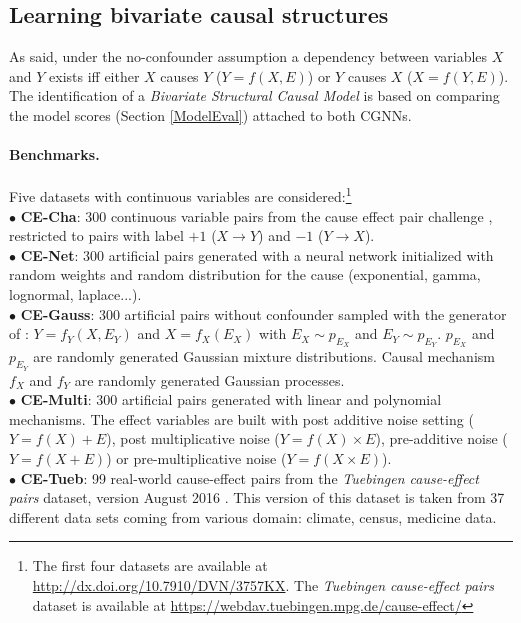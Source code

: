 \documentclass[a4paper, 11pt]{article}
\begin{document}
\subsection{Learning bivariate causal structures \label{bivariate_structure}}\label{sec:bivariate}

As said, under the no-confounder assumption a dependency between variables $X$ and $Y$ exists iff either $X$ causes $Y$ ($Y = f(X,E)$) or $Y$ causes $X$ ($X = f(Y,E)$). The identification of a \textit{Bivariate Structural Causal Model}  is based on comparing the model scores (Section \ref{ModelEval}) attached to both CGNNs.


\paragraph{Benchmarks.} Five datasets with continuous variables are considered:\footnote{The first four datasets are available at \url{http://dx.doi.org/10.7910/DVN/3757KX}. The \textit{Tuebingen cause-effect pairs} dataset is available at \url{https://webdav.tuebingen.mpg.de/cause-effect/}}\\
$\bullet$ \textbf{CE-Cha}: 300 continuous variable pairs from the cause effect pair challenge \citep{guyon2013cepc}, restricted to pairs with label  $+1$ ($X \rightarrow Y$) and $-1$ ($Y \rightarrow X$). \\
$\bullet$ \textbf{CE-Net}: 300 artificial pairs generated with a neural network initialized with random weights and random distribution for the cause (exponential, gamma, lognormal, laplace...).\\
$\bullet$ \textbf{CE-Gauss}: 300 artificial pairs without confounder sampled with the generator of  \cite{mooij2016distinguishing}:
$Y = f_Y(X,E_Y)$ and $X = f_X(E_X)$ with  $E_X \sim p_{E_X}$ and  $E_Y \sim p_{E_Y}$. $p_{E_X}$ and $p_{E_Y}$ are randomly generated Gaussian mixture distributions. Causal mechanism $f_X$ and $f_Y$ are randomly generated Gaussian processes. \\
$\bullet$ \textbf{CE-Multi}: 300 artificial pairs generated with linear and polynomial mechanisms. The effect variables are built with post additive noise setting ($Y = f(X) + E$), post multiplicative noise ($Y = f(X) \times E$), pre-additive noise ($Y = f(X + E)$) or pre-multiplicative noise ($Y = f(X \times E)$).\\
$\bullet$ \textbf{CE-Tueb}: 99 real-world cause-effect pairs from the \textit{Tuebingen cause-effect pairs} dataset, version August 2016 \citep{mooij2016distinguishing}. This version of this dataset is taken from 37 different data sets coming from various domain: climate, census, medicine data.
\end{document}
